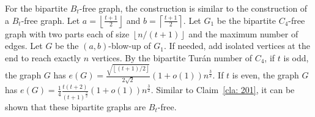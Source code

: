 \documentclass[11pt,a4paper]{article}
\theoremstyle{definition}
\newcommand{\floor}[1]{\left\lfloor #1 \right\rfloor}
\newcommand{\ceil}[1]{\left\lceil #1 \right\rceil}
\begin{document}
        For the bipartite $B_t$-free graph, the construction is similar to the construction of a $B_t$-free graph.
        Let $a = \floor{\frac{t+1}{2}}$ and $b = \ceil{\frac{t+1}{2}}$.
        Let $G_1$ be the bipartite $C_4$-free graph with two parts each of size $\floor{n/(t+1)}$ and the maximum number of edges.
        Let $G$ be the $(a, b)$-blow-up of $G_1$.
        If needed, add isolated vertices at the end to reach exactly $n$ vertices.
        By the bipartite Tur\'{a}n number of $C_4$, if $t$ is odd, the graph $G$ has $e(G) = \frac{\sqrt{\floor{(t+1)/2}}}{2\sqrt{2}}(1 + o(1)) n^{\frac{3}{2}}$.
        If $t$ is even, the graph $G$ has $e(G) = \frac{1}{4} \frac{t(t+2)}{(t+1)^{\frac{3}{2}}}(1+o(1)) n^{\frac{3}{2}}$.
        Similar to Claim~\ref{cla: 201}, it can be shown that these bipartite graphs are $B_t$-free.
\end{document}
